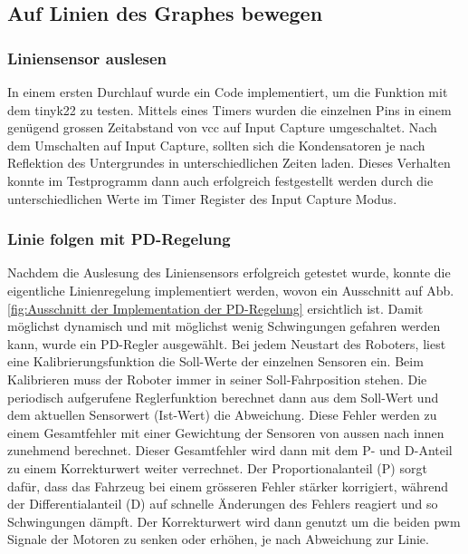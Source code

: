 \subsection{Auf Linien des Graphes bewegen}

\subsubsection{Liniensensor auslesen}
\label{Liniensensor auslesen}

In einem ersten Durchlauf wurde ein Code implementiert, um die Funktion mit dem \gls{tinyk22} zu testen. Mittels eines Timers wurden die einzelnen Pins in einem genügend grossen Zeitabstand von \acrfull{vcc} auf Input Capture umgeschaltet. Nach dem Umschalten auf Input Capture, sollten sich die Kondensatoren je nach Reflektion des Untergrundes in unterschiedlichen Zeiten laden. Dieses Verhalten konnte im Testprogramm dann auch erfolgreich festgestellt werden durch die unterschiedlichen Werte im Timer Register des Input Capture Modus.


\subsubsection{Linie folgen mit PD-Regelung}

Nachdem die Auslesung des Liniensensors erfolgreich getestet wurde, konnte die eigentliche Linienregelung implementiert werden, wovon ein Ausschnitt auf Abb. \ref{fig:Ausschnitt der Implementation der PD-Regelung} ersichtlich ist. Damit möglichst dynamisch und mit möglichst wenig Schwingungen gefahren werden kann, wurde ein PD-Regler ausgewählt. Bei jedem Neustart des Roboters, liest eine Kalibrierungsfunktion die Soll-Werte der einzelnen Sensoren ein. Beim Kalibrieren muss der Roboter immer in seiner Soll-Fahrposition stehen. Die periodisch aufgerufene Reglerfunktion berechnet dann aus dem Soll-Wert und dem aktuellen Sensorwert (Ist-Wert) die Abweichung. Diese Fehler werden zu einem Gesamtfehler mit einer Gewichtung der Sensoren von aussen nach innen zunehmend berechnet. Dieser Gesamtfehler wird dann mit dem P- und D-Anteil zu einem Korrekturwert weiter verrechnet. Der Proportionalanteil (P) sorgt dafür, dass das Fahrzeug bei einem grösseren Fehler stärker korrigiert, während der Differentialanteil (D) auf schnelle Änderungen des Fehlers reagiert und so Schwingungen dämpft. Der Korrekturwert wird dann genutzt um die beiden \acrfull{pwm} Signale der Motoren zu senken oder erhöhen, je nach Abweichung zur Linie.

